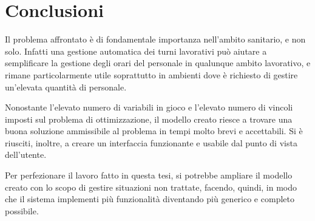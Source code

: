 \chapter{Conclusioni}\label{ch:conclusioni}
Il problema affrontato è di fondamentale importanza nell'ambito sanitario, e non solo.
Infatti una gestione automatica dei turni lavorativi può aiutare a semplificare la gestione degli orari del personale in qualunque ambito lavorativo, e rimane particolarmente utile soprattutto in ambienti dove è richiesto di gestire un'elevata quantità di personale.

Nonostante l'elevato numero di variabili in gioco e l'elevato numero di vincoli imposti sul problema di ottimizzazione, il modello creato riesce a trovare una buona soluzione ammissibile al problema in tempi molto brevi e accettabili. Si è riusciti, inoltre, a creare un interfaccia funzionante e usabile dal punto di vista dell'utente. 

Per perfezionare il lavoro fatto in questa tesi, si potrebbe ampliare il modello creato con lo scopo di gestire situazioni non trattate, facendo, quindi, in modo che il sistema implementi più funzionalità diventando più generico e completo possibile.

